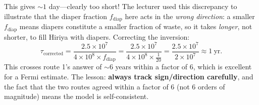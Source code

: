 {\begin{remark}
  This gives $\sim 1$ day---clearly too short! The lecturer used this discrepancy to illustrate that the diaper fraction $f_\text{diap}$ here acts in the \emph{wrong direction}: a smaller $f_\text{diap}$ means diapers constitute a smaller fraction of waste, so it takes \emph{longer}, not shorter, to fill Hiriya with diapers. Correcting the inversion:
  \[
    \tau_\text{corrected} = \frac{2.5\times10^7}{4\times10^8 \times f_\text{diap}}
    = \frac{2.5\times10^7}{4\times10^8 \times \tfrac{1}{20}}
    = \frac{2.5\times10^7}{2\times10^7} \approx 1\ \text{yr}.
  \]
  This crosses route 1's answer of $\sim6$ years within a factor of 6, which is excellent for a Fermi estimate. The lesson: \textbf{always track sign/direction carefully}, and the fact that the two routes agreed within a factor of 6 (not 6 orders of magnitude) means the model is self-consistent.
\end{remark}}

